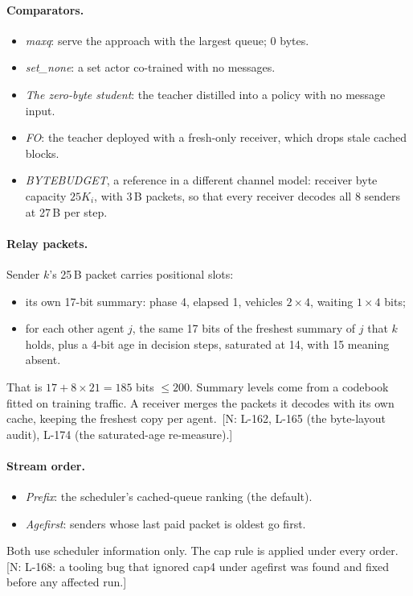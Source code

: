 \documentclass[11pt]{article}
\theoremstyle{definition}
\newif\ifshownotes\shownotestrue
\newcommand{\NOTE}[1]{\ifshownotes{\color{notecol}\,\textsf{\footnotesize[N: #1]}}\fi}
\begin{document}
\paragraph{Comparators.}
\begin{itemize}
\item \emph{maxq}: serve the approach with the largest queue; 0 bytes.
\item \emph{set\_none}: a set actor co-trained with no messages.
\item \emph{The zero-byte student}: the teacher distilled into a policy with no message input.
\item \emph{FO}: the teacher deployed with a fresh-only receiver, which drops stale cached blocks.
\item \emph{BYTEBUDGET}, a reference in a different channel model: receiver byte capacity $25K_i$, with 3\,B packets, so
that every receiver decodes all 8 senders at 27\,B per step.
\end{itemize}
\paragraph{Relay packets.} Sender $k$'s 25\,B packet carries positional slots:
\begin{itemize}
\item its own 17-bit summary: phase 4, elapsed 1, vehicles $2\times4$, waiting $1\times4$ bits;
\item for each other agent $j$, the same 17 bits of the freshest summary of $j$ that $k$ holds, plus a 4-bit age in
decision steps, saturated at 14, with 15 meaning absent.
\end{itemize}
That is $17+8\times21=185$ bits $\le 200$. Summary levels come from a codebook fitted on training traffic. A receiver
merges the packets it decodes with its own cache, keeping the freshest copy per agent.
\NOTE{L-162, L-165 (the byte-layout audit), L-174 (the saturated-age re-measure).}
\paragraph{Stream order.}
\begin{itemize}
\item \emph{Prefix}: the scheduler's cached-queue ranking (the default).
\item \emph{Agefirst}: senders whose last paid packet is oldest go first.
\end{itemize}
Both use scheduler information only. The cap rule is applied under every order.\NOTE{L-168: a tooling bug that ignored
cap4 under agefirst was found and fixed before any affected run.}
\end{document}
